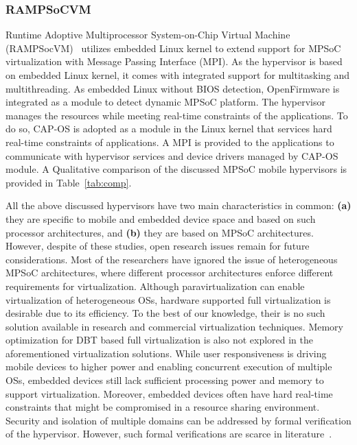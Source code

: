 \documentclass[journal, 10pt]{IEEEtran}
\begin{document}
\subsubsection{RAMPSoCVM}\label{sec:ramp} 
Runtime Adoptive Multiprocessor System-on-Chip Virtual Machine (RAMPSocVM)~\cite{Gohringer2011} utilizes embedded Linux kernel to extend support for MPSoC virtualization with Message Passing Interface (MPI). As the hypervisor is based on embedded Linux kernel, it comes with integrated support for multitasking and multithreading. As embedded Linux without BIOS detection, OpenFirmware is integrated as a module to detect dynamic MPSoC platform. The hypervisor manages the resources while meeting real-time constraints of the applications. To do so, CAP-OS is adopted as a module in the Linux kernel that services hard real-time constraints of applications. A MPI is provided to the applications to communicate with hypervisor services and device drivers managed by CAP-OS module. A Qualitative comparison of the discussed MPSoC mobile hypervisors is provided in Table~\ref{tab:comp}.

All the above discussed hypervisors have two main characteristics in common: \textbf{(a)} they are specific to mobile and embedded device space and based on such processor architectures, and \textbf{(b)} they are based on MPSoC architectures. However, despite of these studies, open research issues remain for future considerations. Most of the researchers have ignored the issue of heterogeneous MPSoC architectures, where different processor architectures enforce different requirements for virtualization. Although paravirtualization can enable virtualization of heterogeneous OSs, hardware supported full virtualization is desirable due to its efficiency. To the best of our knowledge, their is no such solution available in research and commercial virtualization techniques. Memory optimization for DBT based full virtualization is also not explored in the aforementioned virtualization solutions. While user responsiveness is driving mobile devices to higher power and enabling concurrent execution of multiple OSs, embedded devices still lack sufficient processing power and memory to support virtualization. Moreover, embedded devices often have hard real-time constraints that might be compromised in a resource sharing environment. Security and isolation of multiple domains can be addressed by formal verification of the hypervisor. However, such formal verifications are scarce in literature~\cite{Heiser2010a}.  
\end{document}
